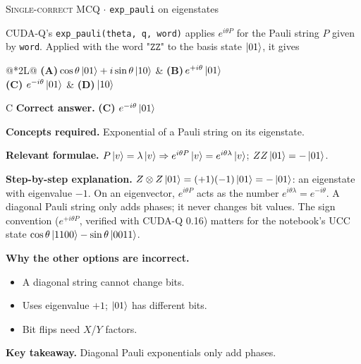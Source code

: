 \documentclass[11pt,a4paper]{article}
\newcommand{\optlabel}[1]{\textbf{(#1)}}
\newcommand{\correctlabel}[1]{\textcolor{okgreen}{\textbf{(#1)}\,\ding{51}}}
\newenvironment{qitem}[1]{\begin{list}{}{\setlength{\leftmargin}{3.3em}\setlength{\labelwidth}{3.1em}%
  \setlength{\labelsep}{0.2em}\setlength{\topsep}{3pt}\setlength{\parsep}{3pt}}\item[\textbf{Q.#1}\hfill]}{\end{list}}
\newcommand{\qsep}{\par\vspace{2pt}{\color{black!15}\hrule}\vspace{4pt}}
\newcommand{\qmeta}[2]{{\footnotesize\color{black!60}\textsc{#1} \;$\cdot$\; #2}\par}
\begin{document}
\begin{qitem}{30}
\qmeta{Single-correct MCQ}{\texttt{exp\_pauli} on eigenstates}
CUDA-Q's \texttt{exp\_pauli(theta, q, word)} applies $e^{i\theta P}$ for the Pauli string $P$ given by \texttt{word}. Applied with the word
$\texttt{"ZZ"}$ to the basis state $\ket{01}$, it gives
\par\smallskip\noindent\begin{tabularx}{\linewidth}{@{}*{2}{L}@{}}
\optlabel{A}\,$\cos\theta\ket{01} + i\sin\theta\ket{10}$ & \optlabel{B}\,$e^{+i\theta}\ket{01}$ \\[3pt]
\correctlabel{C}\,$e^{-i\theta}\ket{01}$ & \optlabel{D}\,$\ket{10}$
\end{tabularx}
\end{qitem}
\begin{solbox}{C}
\textbf{\color{brand}Correct answer.} \textcolor{okgreen}{\textbf{(C)}} $e^{-i\theta}\ket{01}$

\textbf{\color{brand}Concepts required.} Exponential of a Pauli string on its eigenstate.

\textbf{\color{brand}Relevant formulae.} $P\ket v = \lambda\ket v \Rightarrow e^{i\theta P}\ket v = e^{i\theta\lambda}\ket v$; $ZZ\ket{01} = -\ket{01}$.

\textbf{\color{brand}Step-by-step explanation.} $Z\otimes Z\ket{01} = (+1)(-1)\ket{01} = -\ket{01}$: an eigenstate with eigenvalue $-1$. On an eigenvector, $e^{i\theta P}$ acts as the number
$e^{i\theta\lambda} = e^{-i\theta}$. A diagonal Pauli string only adds phases; it never changes bit values. The sign convention ($e^{+i\theta P}$,
verified with CUDA-Q 0.16) matters for the notebook's UCC state $\cos\theta\ket{1100} - \sin\theta\ket{0011}$.

\textbf{\color{brand}Why the other options are incorrect.}
\begin{itemize}[leftmargin=2.4em, itemsep=1pt, topsep=2pt]
\item[\textbf{(A)}] A diagonal string cannot change bits.
\item[\textbf{(B)}] Uses eigenvalue $+1$; $\ket{01}$ has different bits.
\item[\textbf{(D)}] Bit flips need $X$/$Y$ factors.
\end{itemize}
\textbf{\color{brand}Key takeaway.} Diagonal Pauli exponentials only add phases.
\end{solbox}
\qsep
\end{document}
